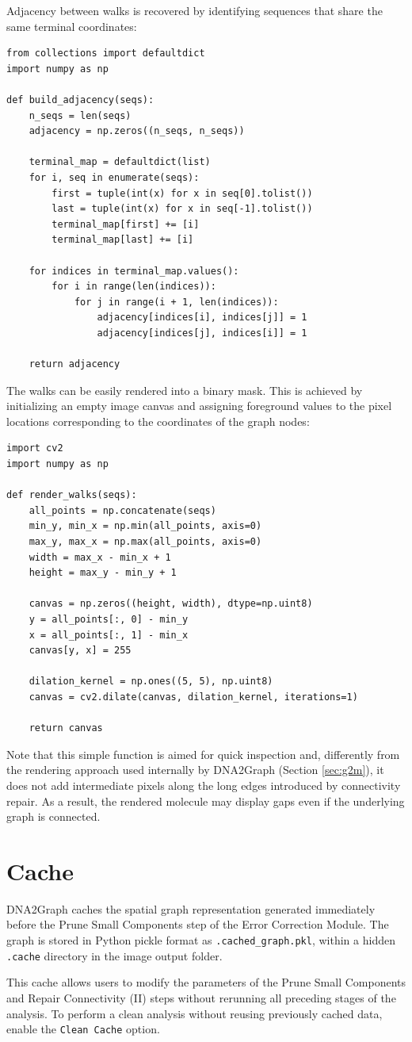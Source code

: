\documentclass[english,12pt,a4paper]{article}
\begin{document}
	Adjacency between walks is recovered by identifying sequences that share the same terminal coordinates:
	
\begin{lstlisting}
from collections import defaultdict
import numpy as np

def build_adjacency(seqs):
	n_seqs = len(seqs)
	adjacency = np.zeros((n_seqs, n_seqs))
	
	terminal_map = defaultdict(list)
	for i, seq in enumerate(seqs):
		first = tuple(int(x) for x in seq[0].tolist())
		last = tuple(int(x) for x in seq[-1].tolist())
		terminal_map[first] += [i]
		terminal_map[last] += [i]
		
	for indices in terminal_map.values():
		for i in range(len(indices)):
			for j in range(i + 1, len(indices)):
				adjacency[indices[i], indices[j]] = 1
				adjacency[indices[j], indices[i]] = 1
				
	return adjacency
\end{lstlisting}

\newpage

The walks can be easily rendered into a binary mask. This is achieved by initializing an empty image canvas and assigning foreground values to the pixel locations corresponding to the coordinates of the graph nodes:
	
	\begin{lstlisting}
import cv2
import numpy as np

def render_walks(seqs):
	all_points = np.concatenate(seqs)
	min_y, min_x = np.min(all_points, axis=0)
	max_y, max_x = np.max(all_points, axis=0)
	width = max_x - min_x + 1
	height = max_y - min_y + 1
	
	canvas = np.zeros((height, width), dtype=np.uint8)
	y = all_points[:, 0] - min_y
	x = all_points[:, 1] - min_x
	canvas[y, x] = 255
	
	dilation_kernel = np.ones((5, 5), np.uint8)
	canvas = cv2.dilate(canvas, dilation_kernel, iterations=1)
	
	return canvas
	\end{lstlisting}
	
Note that this simple function is aimed for quick inspection and, differently from the rendering approach used internally by DNA2Graph (Section \ref{sec:g2m}), it does not add intermediate pixels along the long edges introduced by connectivity repair. As a result, the rendered molecule may display gaps even if the underlying graph is connected.

\section{Cache}

DNA2Graph caches the spatial graph representation generated immediately before the Prune Small Components step of the Error Correction Module. The graph is stored in Python pickle format as \texttt{.cached\_graph.pkl}, within a hidden \texttt{.cache} directory in the image output folder.

This cache allows users to modify the parameters of the Prune Small Components and Repair Connectivity (II) steps without rerunning all preceding stages of the analysis. To perform a clean analysis without reusing previously cached data, enable the \texttt{Clean Cache} option.
\end{document}
